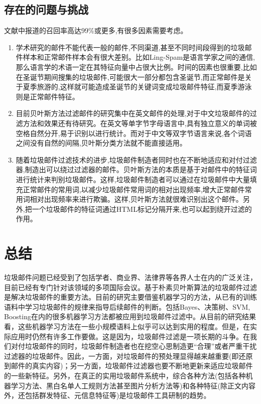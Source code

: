 \documentclass[UTF8]{ctexart}
\begin{document}
\subsection{存在的问题与挑战}
文献中报道的召回率高达99\%或更多,有很多因素需要考虑。
\begin{enumerate}
	\item 学术研究的邮件不能代表一般的邮件,不同渠道,甚至不同时间段得到的垃圾邮件样本和正常邮件样本会有很大差别。比如Ling-Spam是语言学家之间的通信,那么语言学的术语一定在其特征向量中占很大比例。时间的因素也很重要,比如在圣诞节期间搜集的垃圾邮件,可能很大一部分都包含圣诞节,而正常邮件是关于夏季旅游的,这样就可能造成圣诞节的关键词变成垃圾邮件特征,而夏季游泳则是正常邮件特征。
	\item 目前贝叶斯方法过滤邮件的研究集中在英文邮件的处理,对于中文垃圾邮件的过滤方法和效果还有待研究。在英文等单字节字母语言中,具有独立意义的单词被空格自然分开,易于识别以进行统计。而对于中文等双字节语言来说,各个词语之间没有自然的间隔,贝叶斯分类方法就不能直接适用。
	\item 随着垃圾邮件过滤技术的进步,垃圾邮件制造者同时也在不断地适应和对付过滤器,制造出可以绕过过滤器的邮件。贝叶斯方法的本质是基于对邮件中的特征词进行统计来判别垃圾邮件。这样,垃圾邮件制造者可以通过在垃圾邮件中大量填充正常邮件的常用词,以减少垃圾邮件常用词的相对出现频率,增大正常邮件常用词相对出现频率来进行欺骗。这样,贝叶斯方法就很难识别出这个邮件。另外,把一个垃圾邮件的特征词通过HTML标记分隔开来,也可以起到绕开过滤的作用。
\end{enumerate}

\section{总结}
垃圾邮件问题已经受到了包括学者、商业界、法律界等各界人士在内的广泛关注，目前已经有专门针对该领域的多项国际会议。基于朴素贝叶斯算法的垃圾邮件过滤是解决垃圾邮件的重要方法。目前的研究主要借鉴机器学习的方法，从已有的训练语料中学习垃圾邮件的规律来指导后续邮件的判断。包括Bayes、决策树、SVM, Boosting在内的很多机器学习方法都被应用到垃圾邮件过滤中。从目前的研究结果看，这些机器学习方法在一些小规模语料上似乎可以达到实用的程度。但是，在实际应用时仍然有许多工作要做。这是因为，垃圾邮件过滤是一项长期的斗争。在我们对付垃圾邮件的同时，垃圾邮件制造者也在挖空心思制造更“合理”或者严重干扰过滤器的垃圾邮件。因此，一方面，对垃圾邮件的预处理显得越来越重要(即还原到邮件的真实内容)；另一方面，垃圾邮件过滤器也要不断地更新来适应垃圾邮件的一些新特征。另外，在真正的实用垃圾邮件系统中，综合各种方法(包括各种机器学习方法、黑白名单人工规则方法甚至图片分析方法等)和各种特征(除正文内容外，还包括群发特征、元信息特征等)是垃圾邮件工具研制的趋势。
\end{document}
